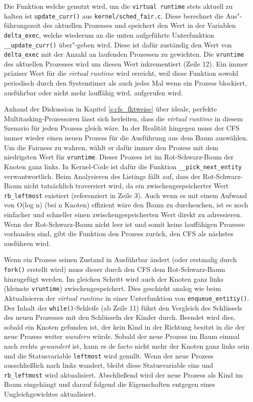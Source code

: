 Die Funktion welche genutzt wird, um die  \texttt{virtual \- runtime} stets aktuell zu halten ist \texttt{update\_curr()} aus \texttt{kernel/sched\_fair.c}. Diese berechnet die Aus"-führungszeit des aktuellen Prozesses und speichert den Wert in der Variablen \texttt{delta\_exec}, welche wiederum an die unten aufgeführte Unterfunktion \texttt{\_\_update\_curr()} über"-geben wird. Diese ist dafür zuständig den Wert von \texttt{delta\-\_exec} mit der Anzahl an laufenden Prozessen zu gewichten. Die \texttt{vruntime} des aktuellen Prozesses wird um diesen Wert inkrementiert (Zeile 12). Ein immer präziser Wert für die \textit{virtual runtime} wird erreicht, weil diese Funktion sowohl periodisch durch den Systemtimer als auch jedes Mal wenn ein Prozess blockiert, ausführbar oder nicht mehr lauffähig wird, aufgerufen wird. 


Anhand der Diskussion in Kapitel \ref{s:cfs_fktweise} über ideale, perfekte Multitasking-Prozessoren lässt sich herleiten, dass die \textit{virtual runtime} in diesem Szenario für jeden Prozess gleich wäre. In der Realität hingegen muss der CFS immer wieder einen neuen Prozess für die Ausführung aus dem Baum auswählen. Um die Fairness zu wahren, wählt er dafür immer den Prozess mit dem niedrigsten Wert für \texttt{vruntime}. Dieser Prozess ist im Rot-Schwarz-Baum der Knoten ganz links. In Kernel-Code ist dafür die Funktion \texttt{\_\_pick\_next\_entity} verwantwortlich. Beim Analysieren des Listings fällt auf, dass der Rot-Schwarz-Baum nicht tatsächlich traversiert wird, da ein zwischengespeicherter Wert \texttt{rb\_leftmost} existiert (referenziert in Zeile 3). Auch wenn es mit einem Aufwand von O(log n) (bei n Knoten) effizient wäre den Baum zu durchsuchen, ist es noch einfacher und schneller einen zwischengespeicherten Wert direkt zu adressieren. Wenn der Rot-Schwarz-Baum nicht leer ist und somit keine lauffähigen Prozesse vorhanden sind, gibt die Funktion den Prozess zurück, den CFS als nächstes ausführen wird.


Wenn ein Prozess seinen Zustand in Ausführbar ändert (oder erstmalig durch \texttt{fork()} erstellt wird) muss dieser durch den CFS dem Rot-Schwarz-Baum hinzugefügt werden. Im gleichen Schritt wird auch der Knoten ganz links (kleinste \texttt{vruntime}) zwischengespeichert. Dies geschieht analog wie beim Aktualisieren der \textit{virtual runtime} in einer Unterfunktion von \texttt{enqueue\_entitiy()}. Der Inhalt der \texttt{while()}-Schleife (ab Zeile 11) führt den Vergleich des Schlüssels des neuen Prozesses mit den Schlüsseln der Kinder durch. Beendet wird dies, sobald ein Knoten gefunden ist, der kein Kind in der Richtung besitzt in die der neue Prozess weiter \textit{wandern} würde. Sobald der neue Prozess im Baum einmal nach rechts \textit{gewandert} ist, kann es de facto nicht mehr der Knoten ganz links sein und die Statusvariable \texttt{leftmost} wird genullt. Wenn der neue Prozess ausschließlich nach links wandert, bleibt diese Statusvariable eins und \texttt{rb\_leftmost} wird aktualisiert. Abschließend wird der neue Prozess als Kind im Baum eingehängt und darauf folgend die Eigenschaften entgegen eines Ungleichgewichtes aktualisiert.


